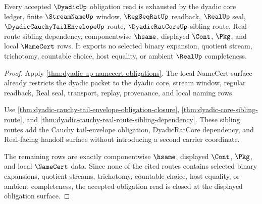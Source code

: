 



\begin{theorem}
\label{thm:dyadic-up-obligation-closure-scope}
Every accepted $\DyadicUp$ obligation read is exhausted by the dyadic core ledger, finite $\StreamNameUp$ window, $\RegSeqRatUp$ readback, $\RealUp$ seal, $\DyadicCauchyTailEnvelopeUp$ route, $\DyadicRatCoreUp$ sibling route, Real-route sibling dependency, componentwise $\hsame$, displayed $\Cont$, $\Pkg$, and local $\NameCert$ rows. It exports no selected binary expansion, quotient stream, trichotomy, countable choice, host equality, or ambient $\RealUp$ completeness.
\end{theorem}
\begin{proof}
Apply \autoref{thm:dyadic-up-namecert-obligations}. The local NameCert surface already restricts the dyadic packet to the dyadic core, stream window, regular readback, Real seal, transport, replay, provenance, and local naming rows.

Use \autoref{thm:dyadic-cauchy-tail-envelope-obligation-closure}, \autoref{thm:dyadic-core-sibling-route}, and \autoref{thm:dyadic-cauchy-real-route-sibling-dependency}. These sibling routes add the Cauchy tail-envelope obligation, DyadicRatCore dependency, and Real-facing handoff surface without introducing a second carrier coordinate.

The remaining rows are exactly componentwise $\hsame$, displayed $\Cont$, $\Pkg$, and local $\NameCert$ data. Since none of the cited routes contains selected binary expansions, quotient streams, trichotomy, countable choice, host equality, or ambient completeness, the accepted obligation read is closed at the displayed obligation surface.
\end{proof}

